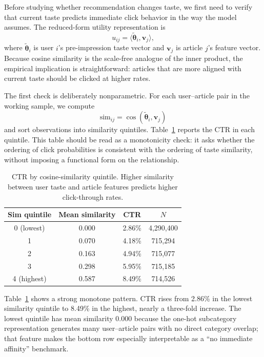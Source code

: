 \documentclass[11pt]{article}
\begin{document}
Before studying whether recommendation changes taste, we first need to verify that current taste predicts immediate click behavior in the way the model assumes. The reduced-form utility representation is
\[
u_{ij} = \langle \tilde{\boldsymbol{\theta}}_i,\mathbf{v}_j\rangle,
\]
where $\tilde{\boldsymbol{\theta}}_i$ is user $i$'s pre-impression taste vector and $\mathbf{v}_j$ is article $j$'s feature vector. Because cosine similarity is the scale-free analogue of the inner product, the empirical implication is straightforward: articles that are more aligned with current taste should be clicked at higher rates.

The first check is deliberately nonparametric. For each user--article pair in the working sample, we compute
\[
\text{sim}_{ij} = \cos(\tilde{\boldsymbol{\theta}}_i,\mathbf{v}_j)
\]
and sort observations into similarity quintiles. Table~\ref{tab:sim_quintile} reports the CTR in each quintile. This table should be read as a monotonicity check: it asks whether the ordering of click probabilities is consistent with the ordering of taste similarity, without imposing a functional form on the relationship.

\begin{table}[ht]
\centering
\caption{CTR by cosine-similarity quintile. Higher similarity between user taste and article features predicts higher click-through rates.}
\label{tab:sim_quintile}
\begin{tabular}{cccc}
\toprule
Sim quintile & Mean similarity & CTR & $N$ \\
\midrule
0 (lowest) & 0.000 & 2.86\% & 4,290,400 \\
1 & 0.070 & 4.18\% & 715,294 \\
2 & 0.163 & 4.94\% & 715,077 \\
3 & 0.298 & 5.95\% & 715,185 \\
4 (highest) & 0.587 & 8.49\% & 714,526 \\
\bottomrule
\end{tabular}
\end{table}
\FloatBarrier

Table~\ref{tab:sim_quintile} shows a strong monotone pattern. CTR rises from 2.86\% in the lowest similarity quintile to 8.49\% in the highest, nearly a three-fold increase. The lowest quintile has mean similarity 0.000 because the one-hot subcategory representation generates many user--article pairs with no direct category overlap; that feature makes the bottom row especially interpretable as a ``no immediate affinity'' benchmark.
\end{document}
